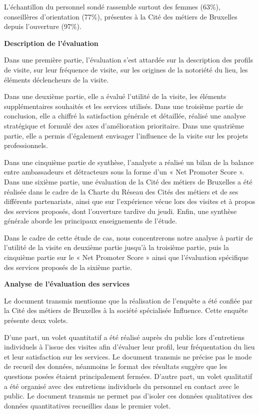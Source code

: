 \documentclass[french,a4paper,12pt]{article}
\begin{document}
\quad L’échantillon du personnel sondé rassemble surtout des femmes (63\%), conseillères d’orientation (77\%), présentes à la Cité des métiers de Bruxelles depuis l’ouverture (97\%).

\textbf{Description de l’évaluation}

\quad Dans une première partie, l’évaluation s’est attardée sur la description des profils de visite, sur leur fréquence de visite, sur les origines de la notoriété du lieu, les éléments déclencheurs de la visite. 

\quad Dans une deuxième partie, elle a évalué l’utilité de la visite, les éléments supplémentaires souhaités et les services utilisés. Dans une troisième partie de conclusion, elle a chiffré la satisfaction générale et détaillée, réalisé une analyse stratégique et formulé des axes d’amélioration prioritaire. Dans une quatrième partie, elle a permis d’également envisager l’influence de la visite sur les projets professionnels. 

\quad Dans une cinquième partie de synthèse, l’analyste a réalisé un bilan de la balance entre ambassadeurs et détracteurs sous la forme d’un « Net Promoter Score ». Dans une sixième partie, une évaluation de la Cité des métiers de Bruxelles a été réalisée dans le cadre de la Charte du Réseau des Cités des métiers et de ses différents partenariats, ainsi que sur l’expérience vécue lors des visites et à propos des services proposés, dont l’ouverture tardive du jeudi. Enfin, une synthèse générale aborde les principaux enseignements de l’étude.

\quad Dans le cadre de cette étude de cas, nous concentrerons notre analyse à partir de l’utilité de la visite en deuxième partie jusqu’à la troisième partie, puis la cinquième partie sur le « Net Promoter Score » ainsi que l’évaluation spécifique des services proposés de la sixième partie.

\textbf{Analyse de l’évaluation des services}

\quad Le document transmis mentionne que la réalisation de l’enquête a été confiée par la Cité des métiers de Bruxelles à la société spécialisée Influence. Cette enquête présente deux volets.

\quad D’une part, un volet quantitatif a été réalisé auprès du public lors d’entretiens individuels à l’issue des visites afin d’évaluer leur profil, leur fréquentation du lieu et leur satisfaction sur les services. Le document transmis ne précise pas le mode de recueil des données, néanmoins le format des résultats suggère que les questions posées étaient principalement fermées.
D’autre part, un volet qualitatif a été organisé avec des entretiens individuels du personnel en contact avec le public. Le document transmis ne permet pas d’isoler ces données qualitatives des données quantitatives recueillies dans le premier volet. 
\end{document}
